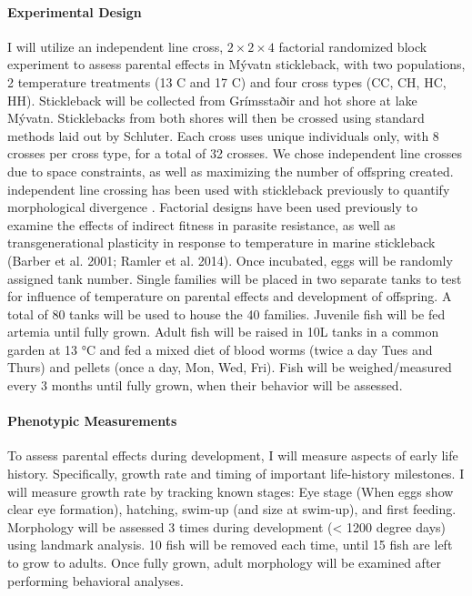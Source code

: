 \documentclass[12pt]{extarticle}
\begin{document}
\paragraph{Experimental Design}
I will utilize an independent line cross, $2 \times 2 \times 4$ factorial randomized block experiment to assess parental effects in Mývatn stickleback, with two populations, 2 temperature treatments (13 \degree C and 17 \degree C) and four cross types (CC, CH, HC, HH). Stickleback will be collected from Grímsstaðir and hot shore at lake M\'yvatn. Sticklebacks from both shores will then be crossed using standard methods laid out by Schluter. Each cross uses unique individuals only, with 8 crosses per cross type, for a total of 32 crosses. We chose independent line crosses due to space constraints, as well as maximizing the number of offspring created. independent line crossing has been used with stickleback previously to quantify morphological divergence \citep{Berner2011}. Factorial designs have been used previously to examine the effects of indirect fitness in parasite resistance, as well as transgenerational plasticity in response to temperature in marine stickleback (Barber et al. 2001; Ramler et al. 2014). Once incubated, eggs will be randomly assigned tank number. Single families will be placed in two separate tanks to test for influence of temperature on parental effects and development of offspring. A total of 80 tanks will be used to house the 40 families. Juvenile fish will be fed artemia until fully grown. Adult fish will be raised in 10L tanks in a common garden at 13 °C and fed a mixed diet of blood worms (twice a day Tues and Thurs) and pellets (once a day, Mon, Wed, Fri). Fish will be weighed/measured every 3 months until fully grown, when their behavior will be assessed. 

\paragraph{Phenotypic Measurements}
To assess parental effects during development, I will measure aspects of early life history. Specifically, growth rate and timing of important life-history milestones. I will measure growth rate by tracking known stages: Eye stage (When eggs show clear eye formation), hatching, swim-up (and size at swim-up), and first feeding. Morphology will be assessed 3 times during development (< 1200 degree days) using landmark analysis. 10 fish will be removed each time, until 15 fish are left to grow to adults. Once fully grown, adult morphology will be examined after performing behavioral analyses.
\end{document}
